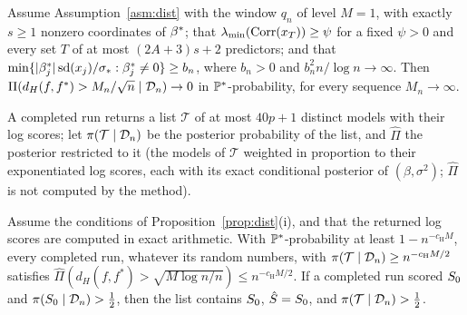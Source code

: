

\begin{theorem}\label{thm:dist-param}
Assume Assumption~\ref{asm:dist} with the window $q_n$ of level $M=1$, with exactly $s\ge1$ nonzero coordinates of $\bstar$;
that $\lmin(\Corr(x_T))\ge\psi$ for a fixed $\psi>0$ and every set $T$ of at most $(2A+3)s+2$ predictors; and that
$\min\{\abs{\beta^*_j}\sd(x_j)/\sigs:\beta^*_j\neq0\}\ge b_n$, where $b_n>0$ and $b_n^2n/\log n\to\infty$. Then
$\Pi(d_H(f,f^*)>M_n/\sqrt n\mid\Dn)\to0$ in $\P^*$-probability, for every sequence $M_n\to\infty$.
\end{theorem}



A completed run returns a list $\mathcal T$ of at most $40p+1$ distinct models with their log scores; let
$\pi(\mathcal T\mid\Dn)$ be the posterior probability of the list, and $\hat\Pi$ the posterior restricted to it (the models
of $\mathcal T$ weighted in proportion to their exponentiated log scores, each with its exact conditional posterior of
$(\beta,\sigma^2)$; $\hat\Pi$ is not computed by the method).

\begin{corollary}\label{cor:dist-output}
Assume the conditions of Proposition~\ref{prop:dist}(i), and that the returned log scores are computed in exact
arithmetic. With $\P^*$-probability at least $1-n^{-c_{\mathrm H}M}$, every completed run, whatever its random numbers, with
$\pi(\mathcal T\mid\Dn)\ge n^{-c_{\mathrm H}M/2}$ satisfies $\hat\Pi(d_H(f,f^*)>\sqrt{M\log n/n})\le n^{-c_{\mathrm H}M/2}$. If a
completed run scored $\Sz$ and $\pi(\Sz\mid\Dn)>\tfrac12$, then the list contains $\Sz$, $\Shat=\Sz$, and $\pi(\mathcal
T\mid\Dn)>\tfrac12$.
\end{corollary}


